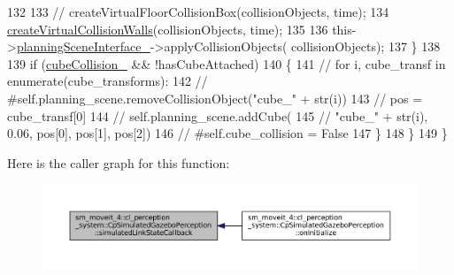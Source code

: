 \begin{DoxyCode}
132 
133                         \textcolor{comment}{// createVirtualFloorCollisionBox(collisionObjects, time);}
134                         \hyperlink{classsm__moveit__4_1_1cl__perception__system_1_1CpSimulatedGazeboPerception_a07c208d7fdcd61338f941bf5620a09ec}{createVirtualCollisionWalls}(collisionObjects, time);
135 
136                         this->\hyperlink{classsm__moveit__4_1_1cl__perception__system_1_1CpSimulatedGazeboPerception_a34bbc7a8b23a1b1c2d3d4d30bd2fe767}{planningSceneInterface\_}->applyCollisionObjects(
      collisionObjects);
137                     \}
138 
139                     \textcolor{keywordflow}{if} (\hyperlink{classsm__moveit__4_1_1cl__perception__system_1_1CpSimulatedGazeboPerception_a5f043c05aa335a438459a55b51e6ace6}{cubeCollision\_} && !hasCubeAttached)
140                     \{
141                         \textcolor{comment}{//         for i, cube\_transf in enumerate(cube\_transforms):}
142                         \textcolor{comment}{//             #self.planning\_scene.removeCollisionObject("cube\_" + str(i))}
143                         \textcolor{comment}{//             pos = cube\_transf[0]}
144                         \textcolor{comment}{//             self.planning\_scene.addCube(}
145                         \textcolor{comment}{//                 "cube\_" + str(i), 0.06, pos[0],  pos[1],  pos[2])}
146                         \textcolor{comment}{//             #self.cube\_collision = False}
147                     \}
148                 \}
149             \}
\end{DoxyCode}
Here is the caller graph for this function\+:
\nopagebreak
\begin{figure}[H]
\begin{center}
\leavevmode
\includegraphics[width=350pt]{classsm__moveit__4_1_1cl__perception__system_1_1CpSimulatedGazeboPerception_a7914ffd20518c866a8a1e11254589d12_icgraph}
\end{center}
\end{figure}
\mbox{\label{classsm__moveit__4_1_1cl__perception__system_1_1CpSimulatedGazeboPerception_a7f5d68f2ff7dd0ade9756058e790efa1}} 
